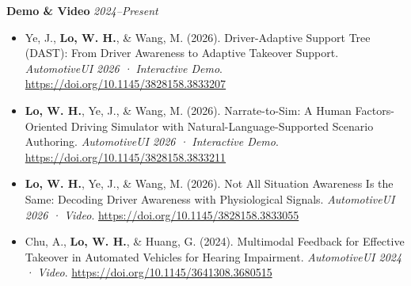 \documentclass[11pt]{article}
\begin{document}
\vspace{0.6em}


\textbf{Demo \& Video} \hfill \textit{2024--Present}

\vspace{0.4em}

\begin{itemize}[leftmargin=*, topsep=0pt, itemsep=6pt]

  \item \begin{samepage}Ye, J., \textbf{Lo, W. H.}, \& Wang, M. (2026). Driver-Adaptive Support Tree (DAST): From Driver Awareness to Adaptive Takeover Support. \textit{AutomotiveUI 2026 · Interactive Demo}. \href{https://doi.org/10.1145/3828158.3833207}{\url{https://doi.org/10.1145/3828158.3833207}}
  \par\end{samepage}

  \item \begin{samepage}\textbf{Lo, W. H.}, Ye, J., \& Wang, M. (2026). Narrate-to-Sim: A Human Factors-Oriented Driving Simulator with Natural-Language-Supported Scenario Authoring. \textit{AutomotiveUI 2026 · Interactive Demo}. \href{https://doi.org/10.1145/3828158.3833211}{\url{https://doi.org/10.1145/3828158.3833211}}
  \par\end{samepage}

  \item \begin{samepage}\textbf{Lo, W. H.}, Ye, J., \& Wang, M. (2026). Not All Situation Awareness Is the Same: Decoding Driver Awareness with Physiological Signals. \textit{AutomotiveUI 2026 · Video}. \href{https://doi.org/10.1145/3828158.3833055}{\url{https://doi.org/10.1145/3828158.3833055}}
  \par\end{samepage}

  \item \begin{samepage}Chu, A., \textbf{Lo, W. H.}, \& Huang, G. (2024). Multimodal Feedback for Effective Takeover in Automated Vehicles for Hearing Impairment. \textit{AutomotiveUI 2024 · Video}. \href{https://doi.org/10.1145/3641308.3680515}{\url{https://doi.org/10.1145/3641308.3680515}}
  \par\end{samepage}

\end{itemize}
\end{document}
